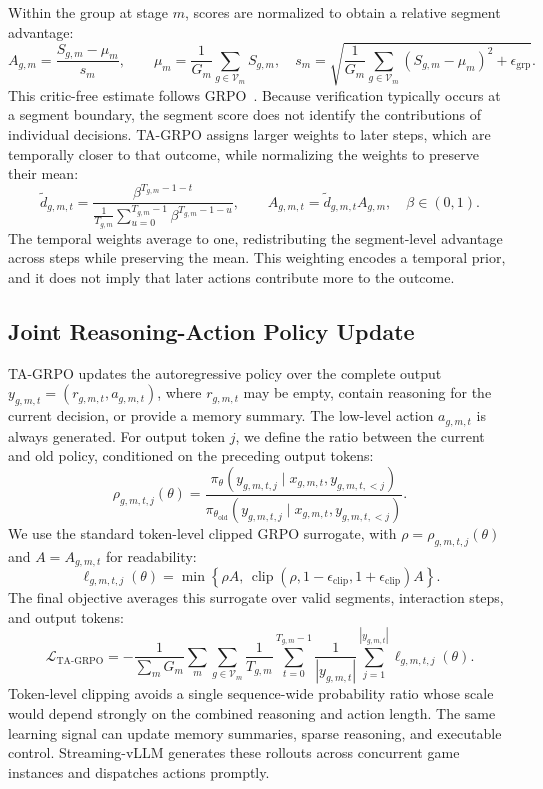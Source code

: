 Within the group at stage $m$, scores are normalized to obtain a relative segment advantage:
\begin{equation}
\label{eq:segment_advantage}
A_{g,m}=\frac{S_{g,m}-\mu_m}{s_m},\qquad
\mu_m=\frac{1}{G_m}\sum_{g\in\mathcal V_m}S_{g,m},\quad
s_m=\sqrt{\frac{1}{G_m}\sum_{g\in\mathcal V_m}(S_{g,m}-\mu_m)^2+\epsilon_{\mathrm{grp}}}.
\end{equation}
This critic-free estimate follows GRPO~\cite{shao2024deepseekmath}. Because verification typically occurs at a segment boundary, the segment score does not identify the contributions of individual decisions. TA-GRPO assigns larger weights to later steps, which are temporally closer to that outcome, while normalizing the weights to preserve their mean:
\begin{equation}
\label{eq:temporal_advantage}
\widetilde d_{g,m,t}=\frac{\beta^{T_{g,m}-1-t}}{\frac{1}{T_{g,m}}\sum_{u=0}^{T_{g,m}-1}\beta^{T_{g,m}-1-u}},\qquad
A_{g,m,t}=\widetilde d_{g,m,t}A_{g,m},\quad \beta\in(0,1).
\end{equation}
The temporal weights average to one, redistributing the segment-level advantage across steps while preserving the mean. This weighting encodes a temporal prior, and it does not imply that later actions contribute more to the outcome.

\subsection{Joint Reasoning-Action Policy Update}
\label{sec:ta_grpo_update}

TA-GRPO updates the autoregressive policy over the complete output $y_{g,m,t}=(r_{g,m,t},a_{g,m,t})$, where $r_{g,m,t}$ may be empty, contain reasoning for the current decision, or provide a memory summary. The low-level action $a_{g,m,t}$ is always generated. For output token $j$, we define the ratio between the current and old policy, conditioned on the preceding output tokens:
\begin{equation}
\label{eq:token_policy_ratio}
\rho_{g,m,t,j}(\theta)=\frac{\pi_\theta(y_{g,m,t,j}\mid x_{g,m,t},y_{g,m,t,<j})}{\pi_{\theta_{\mathrm{old}}}(y_{g,m,t,j}\mid x_{g,m,t},y_{g,m,t,<j})}.
\end{equation}
We use the standard token-level clipped GRPO surrogate, with $\rho=\rho_{g,m,t,j}(\theta)$ and $A=A_{g,m,t}$ for readability:
\[
\ell_{g,m,t,j}(\theta)
=\min\!\left\{\rho A,\,
\operatorname{clip}\!\left(\rho,1-\epsilon_{\mathrm{clip}},1+\epsilon_{\mathrm{clip}}\right)A\right\}.
\]
The final objective averages this surrogate over valid segments, interaction steps, and output tokens:
\begin{equation}
\label{eq:ta_grpo_objective}
\mathcal L_{\mathrm{TA\text{-}GRPO}}=-\frac{1}{\sum_m G_m}\sum_m\sum_{g\in\mathcal V_m}\frac{1}{T_{g,m}}\sum_{t=0}^{T_{g,m}-1}\frac{1}{|y_{g,m,t}|}\sum_{j=1}^{|y_{g,m,t}|}\ell_{g,m,t,j}(\theta).
\end{equation}
Token-level clipping avoids a single sequence-wide probability ratio whose scale would depend strongly on the combined reasoning and action length. The same learning signal can update memory summaries, sparse reasoning, and executable control. Streaming-vLLM generates these rollouts across concurrent game instances and dispatches actions promptly.
